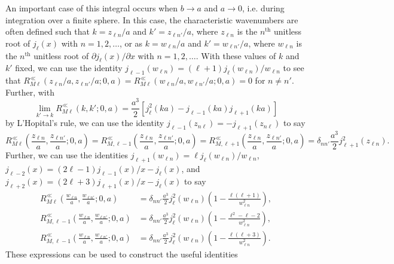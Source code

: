 An important case of this integral occurs when $b\to a$ and $a\to0$, i.e. during integration over a finite sphere. In this case, the characteristic wavenumbers are often defined such that $k = z_{\ell n}/a$ and $k' = z_{\ell n'}/a$, where $z_{\ell n}$ is the $n^\mathrm{th}$ unitless root of $j_\ell(x)$ with $n = 1,2,\ldots$, or as $k = w_{\ell n}/a$ and $k' = w_{\ell n'}/a$, where $w_{\ell n}$ is the $n^\mathrm{th}$ unitless root of $\partial j_\ell(x)/\partial x$ with $n = 1,2,\ldots$. With these values of $k$ and $k'$ fixed, we can use the identity $j_{\ell - 1}(w_{\ell n}) = (\ell + 1)j_\ell(w_{\ell n})/w_{\ell n}$ to see that $R_{M\ell}^\ll(z_{\ell n}/a,z_{\ell n'}/a;0,a) = R_{M\ell}^\ll(w_{\ell n}/a,w_{\ell n'}/a;0,a) = 0$ for $n\neq n'$. Further, with
\begin{equation}
\lim_{k'\to k}R_{M\ell}^\ll(k,k';0,a) = \frac{a^3}{2}\left[j_\ell^2(ka) - j_{\ell - 1}(ka)j_{\ell + 1}(ka)\right]
\end{equation}
by L'Hopital's rule, we can use the identity $j_{\ell - 1}(z_{n\ell}) = -j_{\ell + 1}(z_{n\ell})$ to say
\begin{equation}
R_{M\ell}^\ll\left(\frac{z_{\ell n}}{a},\frac{z_{\ell n'}}{a};0,a\right) = R_{M,\ell-1}^\ll\left(\frac{z_{\ell n}}{a},\frac{z_{\ell n'}}{a};0,a\right) = R_{M,\ell+1}^\ll\left(\frac{z_{\ell n}}{a},\frac{z_{\ell n'}}{a};0,a\right) = \delta_{nn'}\frac{a^3}{2}j_{\ell + 1}^2(z_{\ell n}).
\end{equation}
Further, we can use the identities $j_{\ell + 1}(w_{\ell n}) = \ell j_\ell(w_{\ell n})/w_{\ell n}$, $j_{\ell - 2}(x) = (2\ell - 1)j_{\ell - 1}(x)/x - j_\ell(x)$, and $j_{\ell + 2}(x) = (2\ell + 3)j_{\ell + 1}(x)/x - j_\ell(x)$ to say
\begin{equation}
\begin{split}
R_{M\ell}^\ll\left(\frac{w_{\ell n}}{a},\frac{w_{\ell n'}}{a};0,a\right) &= \delta_{nn'}\frac{a^3}{2}j_\ell^2(w_{\ell n})\left(1 - \frac{\ell(\ell + 1)}{w_{\ell n}^2}\right),\\
R_{M,\ell - 1}^\ll\left(\frac{w_{\ell n}}{a},\frac{w_{\ell n'}}{a};0,a\right) &= \delta_{nn'}\frac{a^3}{2}j_{\ell}^2(w_{\ell n})\left(1 - \frac{\ell^2 - \ell-2}{w_{\ell n}^2}\right),\\
R_{M,\ell - 1}^\ll\left(\frac{w_{\ell n}}{a},\frac{w_{\ell n'}}{a};0,a\right) &= \delta_{nn'}\frac{a^3}{2}j_{\ell}^2(w_{\ell n})\left(1 - \frac{\ell(\ell + 3)}{w_{\ell n}^2}\right).
\end{split}
\end{equation}
These expressions can be used to construct the useful identities
